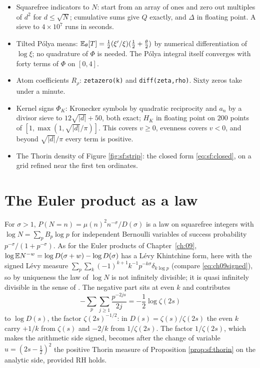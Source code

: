 \begin{itemize}
\item Squarefree indicators to $N$: start from an array of ones and zero out multiples of $d^2$ for $d\le\sqrt N$; cumulative sums give $Q$ exactly, and $\Delta$ in floating point. A sieve to $4\times10^7$ runs in seconds.
\item Tilted P\'olya means: $\mathbb{E}_\theta[T]=\frac12(\xi'/\xi)(\frac12+\frac\theta2)$ by numerical differentiation of $\log\xi$; no quadrature of $\Phi$ is needed. The P\'olya integral itself converges with forty terms of $\Phi$ on $[0,4]$.
\item Atom coefficients $R_\rho$: \texttt{zetazero(k)} and \texttt{diff(zeta,rho)}. Sixty zeros take under a minute.
\item Kernel signs $\Phi_K$: Kronecker symbols by quadratic reciprocity and $a_n$ by a divisor sieve to $12\sqrt{|d|}+50$, both exact; $H_K$ in floating point on $200$ points of $[1,\max(1,\sqrt{|d|}/\pi)]$. This covers $v\ge0$, evenness covers $v<0$, and beyond $\sqrt{|d|}/\pi$ every term is positive.
\item The Thorin density of Figure \ref{fig:sf:strip}: the closed form \eqref{eq:sf:closed}, on a grid refined near the first ten ordinates.
\end{itemize}

\section{The Euler product as a law}\label{sec:sf:euler}

For $\sigma>1$, $P(N=n)=\mu(n)^2n^{-\sigma}/D(\sigma)$ is a law on squarefree integers with $\log N=\sum_pB_p\log p$ for independent Bernoulli variables of success probability $p^{-\sigma}/(1+p^{-\sigma})$. As for the Euler products of Chapter~\ref{ch:09}, $\log\mathbb{E} N^{-w}=\log D(\sigma+w)-\log D(\sigma)$ has a L\'evy Khintchine form, here with the signed L\'evy measure $\sum_p\sum_k(-1)^{k+1}k^{-1}p^{-k\sigma}\delta_{k\log p}$ (compare \eqref{eq:ch09signed}), so by uniqueness the law of $\log N$ is not infinitely divisible; it is quasi infinitely divisible in the sense of \cite{lindnerpansato2018}. The negative part sits at even $k$ and contributes
\[
-\sum_p\sum_{j\ge1}\frac{p^{-2js}}{2j}=-\frac12\log\zeta(2s)
\]
to $\log D(s)$, the factor $\zeta(2s)^{-1/2}$: in $D(s)=\zeta(s)/\zeta(2s)$ the even $k$ carry $+1/k$ from $\zeta(s)$ and $-2/k$ from $1/\zeta(2s)$. The factor $1/\zeta(2s)$, which makes the arithmetic side signed, becomes after the change of variable $u=(2s-\frac12)^2$ the positive Thorin measure of Proposition \ref{prop:sf:thorin} on the analytic side, provided RH holds.

